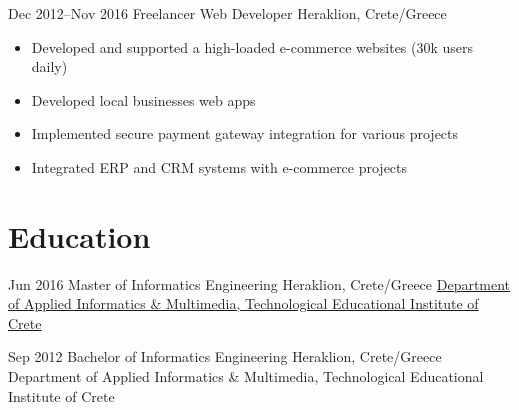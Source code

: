 \begin{entrylist}
\entry
{Dec 2012--Nov 2016}
{Freelancer Web Developer}
{Heraklion, Crete/Greece}
\vspace{-0.6cm}
\begin{itemize}[leftmargin=.6cm]
	\item Developed and supported a high-loaded e-commerce websites (30k users daily)
	\item Developed local businesses web apps 
	\item Implemented secure payment gateway integration for various projects
	\item Integrated ERP and CRM systems with e-commerce projects 
\end{itemize}

\end{entrylist}

\vspace{0.3cm}
\section{\normalfont Education}
\vspace{-0.1cm}
\begin{entrylist}
\entry
{Jun 2016}
{Master {\normalfont of Informatics Engineering}}
{Heraklion, Crete/Greece}
{\href{https://www.teicrete.gr/}{Department of Applied Informatics \& Multimedia, Technological Educational Institute of Crete}}
\\
\vspace{-.4cm}

\entry
{Sep 2012}
{Bachelor {\normalfont of Informatics Engineering}}
{Heraklion, Crete/Greece}
Department of Applied Informatics \& Multimedia, Technological Educational Institute of Crete
\end{entrylist}

\vspace{0.3cm}
